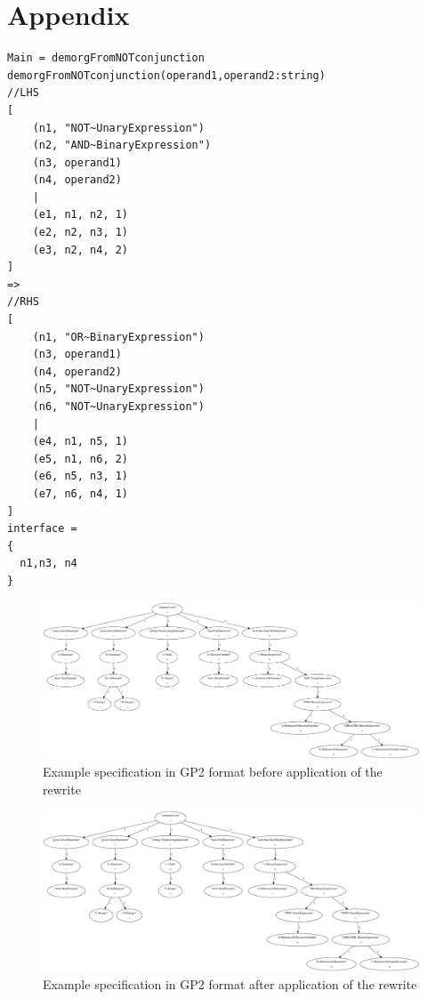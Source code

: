 \documentclass[runningheads]{llncs}
\begin{document}
\clearpage
\appendix

\section{Appendix}
\label{appendix}

\begin{lstlisting}[caption={A De Morgan rule implemented in GP2},label={lst:demorgGP2}]
Main = demorgFromNOTconjunction
demorgFromNOTconjunction(operand1,operand2:string)
//LHS
[
    (n1, "NOT~UnaryExpression")
    (n2, "AND~BinaryExpression")
    (n3, operand1)
    (n4, operand2)
    |
    (e1, n1, n2, 1)
    (e2, n2, n3, 1)
    (e3, n2, n4, 2)
]
=>
//RHS
[
    (n1, "OR~BinaryExpression")
    (n3, operand1)
    (n4, operand2)
    (n5, "NOT~UnaryExpression")
    (n6, "NOT~UnaryExpression")
    |
    (e4, n1, n5, 1)
    (e5, n1, n6, 2)
    (e6, n5, n3, 1)
    (e7, n6, n4, 1)
]
interface =
{
  n1,n3, n4
}
\end{lstlisting}

\newpage

\begin{figure}[H]
\begin{center}
\includegraphics[angle=90,height=0.9\textheight,width=\textwidth]{demorg-BEFORE.pdf}
\end{center}
\caption{Example specification in GP2 format before application of the rewrite}
\label{fig:demorg-BEFORE}
\end{figure}


\begin{figure}[H]
\begin{center}
\includegraphics[angle=90,height=0.9\textheight,width=\textwidth]{demorg-AFTER.pdf}
\end{center}
\caption{Example specification in GP2 format after application of the rewrite}
\label{fig:demorg-AFTER}
\end{figure}




\end{document}
